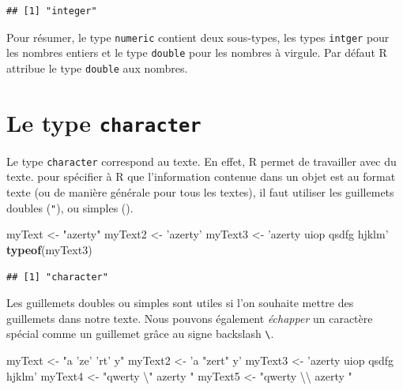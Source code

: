 \documentclass[]{book}
\newenvironment{Shaded}{\begin{snugshade}}{\end{snugshade}}
\newcommand{\KeywordTok}[1]{\textcolor[rgb]{0.13,0.29,0.53}{\textbf{#1}}}
\newcommand{\CharTok}[1]{\textcolor[rgb]{0.31,0.60,0.02}{#1}}
\newcommand{\StringTok}[1]{\textcolor[rgb]{0.31,0.60,0.02}{#1}}
\newcommand{\NormalTok}[1]{#1}
\begin{document}
\begin{verbatim}
## [1] "integer"
\end{verbatim}

Pour résumer, le type \texttt{numeric} contient deux sous-types, les
types \texttt{intger} pour les nombres entiers et le type
\texttt{double} pour les nombres à virgule. Par défaut R attribue le
type \texttt{double} aux nombres.

\section{\texorpdfstring{Le type
\texttt{character}}{Le type character}}\label{le-type-character}

Le type \texttt{character} correspond au texte. En effet, R permet de
travailler avec du texte. pour spécifier à R que l'information contenue
dans un objet est au format texte (ou de manière générale pour tous les
textes), il faut utiliser les guillemets doubles (\texttt{"}), ou
simples (\texttt{\textquotesingle{}}).

\begin{Shaded}
\begin{Highlighting}[]
\NormalTok{myText <-}\StringTok{ "azerty"}
\NormalTok{myText2 <-}\StringTok{ 'azerty'}
\NormalTok{myText3 <-}\StringTok{ 'azerty uiop qsdfg hjklm'}
\KeywordTok{typeof}\NormalTok{(myText3)}
\end{Highlighting}
\end{Shaded}

\begin{verbatim}
## [1] "character"
\end{verbatim}

Les guillemets doubles ou simples sont utiles si l'on souhaite mettre
des guillemets dans notre texte. Nous pouvons également \emph{échapper}
un caractère spécial comme un guillemet grâce au signe backslash
\texttt{\textbackslash{}}.

\begin{Shaded}
\begin{Highlighting}[]
\NormalTok{myText <-}\StringTok{ "a 'ze' 'rt' y"}
\NormalTok{myText2 <-}\StringTok{ 'a "zert" y'}
\NormalTok{myText3 <-}\StringTok{ 'azerty uiop qsdfg hjklm'}
\NormalTok{myText4 <-}\StringTok{ "qwerty }\CharTok{\textbackslash{}"}\StringTok{ azerty "}
\NormalTok{myText5 <-}\StringTok{ "qwerty }\CharTok{\textbackslash{}\textbackslash{}}\StringTok{ azerty "}
\end{Highlighting}
\end{Shaded}
\end{document}
